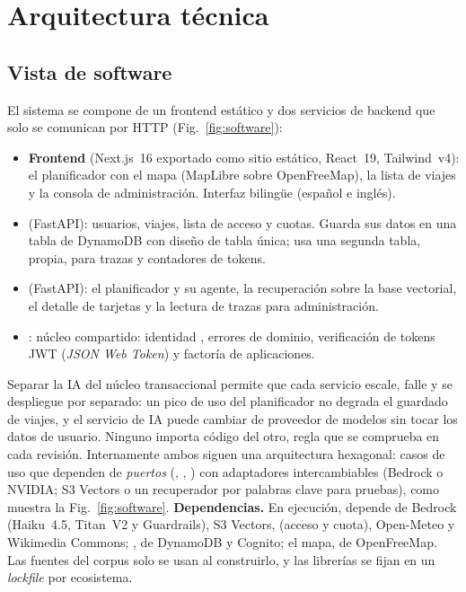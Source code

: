 \section{Arquitectura técnica}\label{sec:arquitectura}

\subsection{Vista de software}

El sistema se compone de un frontend estático y dos servicios de backend que solo se comunican por
HTTP (Fig.~\ref{fig:software}):

\begin{itemize}
  \item \textbf{Frontend} (Next.js~16 exportado como sitio estático, React~19, Tailwind~v4): el
        planificador con el mapa (MapLibre sobre OpenFreeMap), la lista de viajes y la consola de
        administración. Interfaz bilingüe (español e inglés).
  \item \textbf{} (FastAPI): usuarios, viajes, lista de acceso y cuotas. Guarda sus
        datos en una tabla de DynamoDB con diseño de tabla única;  usa
        una segunda tabla, propia, para trazas y contadores de tokens.
  \item \textbf{} (FastAPI): el planificador y su agente, la recuperación sobre la
        base vectorial, el detalle de tarjetas y la lectura de trazas para administración.
  \item \textbf{}: núcleo compartido: identidad , errores de
        dominio, verificación de tokens JWT (\emph{JSON Web Token}) y factoría de aplicaciones.
\end{itemize}

Separar la IA del núcleo transaccional permite que cada servicio escale, falle y se
despliegue por separado: un pico de uso del planificador no degrada el guardado de viajes, y el
servicio de IA puede cambiar de proveedor de modelos sin tocar los datos de usuario. Ninguno
importa código del otro, regla que se comprueba en cada revisión. Internamente ambos siguen una
arquitectura hexagonal: casos de uso que dependen de \emph{puertos} (,
, ) con adaptadores intercambiables (Bedrock o NVIDIA; S3 Vectors
o un recuperador por palabras clave para pruebas), como muestra la Fig.~\ref{fig:software}.
\textbf{Dependencias.} En ejecución,  depende de Bedrock (Haiku~4.5, Titan~V2 y
Guardrails), S3 Vectors,  (acceso y cuota), Open-Meteo y Wikimedia Commons;
, de DynamoDB y Cognito; el mapa, de OpenFreeMap. Las fuentes del corpus solo se
usan al construirlo, y las librerías se fijan en un \emph{lockfile} por ecosistema.

